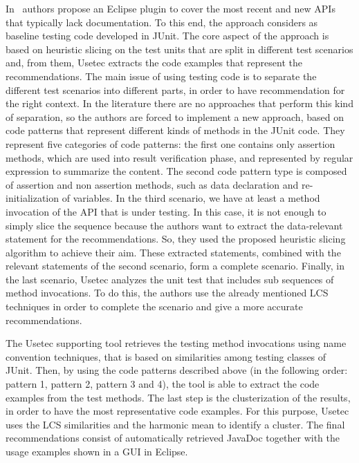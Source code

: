 In~\cite{zhu_mining_2014} authors propose an Eclipse plugin to cover the most 
recent and new APIs that typically lack documentation. To this end, the 
approach considers as baseline testing code developed in JUnit.
The core aspect of the approach is based on heuristic slicing on the test units 
that are split in different test scenarios and, from them, Usetec extracts the 
code examples that represent the recommendations. The main issue of using 
testing code is to separate the different test scenarios into different parts, 
in order to have recommendation for the right context. In the literature there 
are no approaches that perform this kind of separation, so the authors are 
forced to implement a new approach, based on code patterns that represent 
different kinds of methods in the JUnit code. They represent five categories of 
code patterns: the first one contains only assertion methods, which are used 
into result verification phase, and represented by regular expression to 
summarize the content. The second code pattern type is composed of assertion 
and non assertion methods, such as data declaration and re-initialization of 
variables. In the third scenario, we have at least a method invocation of the 
API that is under testing. In this case, it is not enough to simply slice the 
sequence because the authors want to extract the data-relevant statement for 
the recommendations. So, they used the proposed heuristic slicing algorithm to 
achieve their aim. These extracted statements, combined with the relevant 
statements of the second scenario, form a complete scenario. Finally, in the 
last scenario, Usetec analyzes the unit test that includes sub sequences of 
method invocations. To do this, the authors use the already mentioned LCS 
techniques in order to complete the scenario and give a more accurate 
recommendations. 

The Usetec supporting tool retrieves the testing method invocations using name 
convention techniques, that is based on similarities among testing classes of 
JUnit.  Then, by using the code patterns described above (in the following 
order: pattern 1, pattern 2, pattern 3 and 4), the tool is able to extract the 
code examples from the test methods. The last step is the clusterization of the 
results, in order to have the most representative code examples. For this 
purpose, Usetec uses the LCS similarities and the harmonic mean to identify a 
cluster. The final recommendations consist of automatically retrieved JavaDoc 
together with the usage examples shown in a GUI in Eclipse. 

